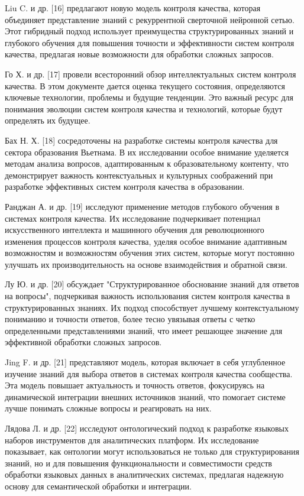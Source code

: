 Liu C. и др. {[}16{]} предлагают новую модель контроля качества, которая
объединяет представление знаний с рекуррентной сверточной нейронной
сетью. Этот гибридный подход использует преимущества структурированных
знаний и глубокого обучения для повышения точности и эффективности
систем контроля качества, предлагая новые возможности для обработки
сложных запросов.

Го Х. и др. {[}17{]} провели всесторонний обзор интеллектуальных систем
контроля качества. В этом документе дается оценка текущего состояния,
определяются ключевые технологии, проблемы и будущие тенденции. Это
важный ресурс для понимания эволюции систем контроля качества и
технологий, которые будут определять их будущее.

Бах Н. Х. {[}18{]} сосредоточены на разработке системы контроля качества
для сектора образования Вьетнама. В их исследовании особое внимание
уделяется методам анализа вопросов, адаптированным к образовательному
контенту, что демонстрирует важность контекстуальных и культурных
соображений при разработке эффективных систем контроля качества в
образовании.

Ранджан А. и др. {[}19{]} исследуют применение методов глубокого
обучения в системах контроля качества. Их исследование подчеркивает
потенциал искусственного интеллекта и машинного обучения для
революционного изменения процессов контроля качества, уделяя особое
внимание адаптивным возможностям и возможностям обучения этих систем,
которые могут постоянно улучшать их производительность на основе
взаимодействия и обратной связи.

Лу Ю. и др. {[}20{]} обсуждает "Структурированное обоснование знаний для
ответов на вопросы", подчеркивая важность использования систем контроля
качества в структурированных знаниях. Их подход способствует лучшему
контекстуальному пониманию и точности ответов, более тесно увязывая
ответы с четко определенными представлениями знаний, что имеет решающее
значение для эффективной обработки сложных запросов.

Jing F. и др. {[}21{]} представляют модель, которая включает в себя
углубленное изучение знаний для выбора ответов в системах контроля
качества сообщества. Эта модель повышает актуальность и точность
ответов, фокусируясь на динамической интеграции внешних источников
знаний, что помогает системе лучше понимать сложные вопросы и
реагировать на них.

Лядова Л. и др. {[}22{]} исследуют онтологический подход к разработке
языковых наборов инструментов для аналитических платформ. Их
исследование показывает, как онтологии могут использоваться не только
для структурирования знаний, но и для повышения функциональности и
совместимости средств обработки языковых данных в аналитических
системах, предлагая надежную основу для семантической обработки и
интеграции.

